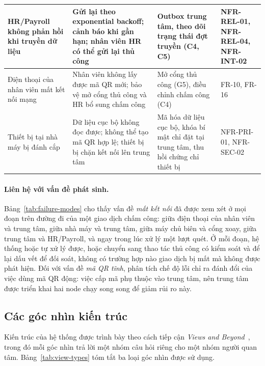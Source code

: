 \begin{longtable}{|>{\raggedright\arraybackslash}p{3.2cm}|>{\raggedright\arraybackslash}p{5.4cm}|>{\raggedright\arraybackslash}p{4.0cm}|>{\raggedright\arraybackslash}p{2.2cm}|}
\hline
HR/Payroll không phản hồi khi truyền dữ liệu & Gửi lại theo exponential backoff; cảnh báo khi gần hạn; nhân viên HR có thể gửi lại thủ công & Outbox trung tâm, theo dõi trạng thái đợt truyền (C4, C5) & NFR-REL-01, NFR-REL-04, NFR-INT-02 \\
\hline
Điện thoại của nhân viên mất kết nối mạng & Nhân viên không lấy được mã QR mới; bảo vệ mở cổng thủ công và HR bổ sung chấm công & Mở cổng thủ công (G5), điều chỉnh chấm công (C4) & FR-10, FR-16 \\
\hline
Thiết bị tại nhà máy bị đánh cắp & Dữ liệu cục bộ không đọc được; không thể tạo mã QR hợp lệ; thiết bị bị chặn kết nối lên trung tâm & Mã hóa dữ liệu cục bộ, khóa bí mật chỉ đặt tại trung tâm, thu hồi chứng chỉ thiết bị & NFR-PRI-01, NFR-SEC-02 \\
\hline
\end{longtable}
\endgroup

\paragraph{Liên hệ với vấn đề phát sinh.} Bảng~\ref{tab:failure-modes} cho thấy vấn đề \textit{mất kết nối} đã được xem xét ở mọi đoạn trên đường đi của một giao dịch chấm công: giữa điện thoại của nhân viên và trung tâm, giữa nhà máy và trung tâm, giữa máy chủ biên và cổng xoay, giữa trung tâm và HR/Payroll, và ngay trong lúc xử lý một lượt quét. Ở mỗi đoạn, hệ thống hoặc tự xử lý được, hoặc chuyển sang thao tác thủ công có kiểm soát và để lại dấu vết để đối soát, không có trường hợp nào giao dịch bị mất mà không được phát hiện. Đối với vấn đề \textit{mã QR tĩnh}, phân tích chế độ lỗi chỉ ra đánh đổi của việc dùng mã QR động: việc cấp mã phụ thuộc vào trung tâm, nên trung tâm được triển khai hai node chạy song song để giảm rủi ro này.

\subsection{Các góc nhìn kiến trúc}\label{sec:views}
Kiến trúc của hệ thống được trình bày theo cách tiếp cận \textit{Views and Beyond}~\cite{clements2010documenting}, trong đó mỗi góc nhìn trả lời một nhóm câu hỏi riêng cho một nhóm người quan tâm. Bảng~\ref{tab:view-types} tóm tắt ba loại góc nhìn được sử dụng.

